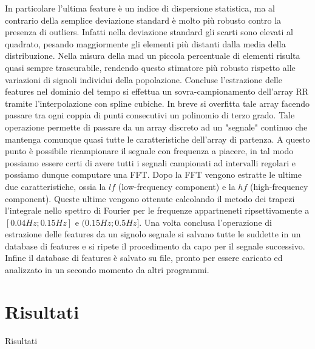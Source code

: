 \documentclass[12pt,a4paper, twoside, openright]{report}
\begin{document}
In particolare l'ultima feature è un indice di dispersione statistica, ma al contrario della semplice deviazione standard è molto più robusto contro la presenza di outliers.
Infatti nella deviazione standard gli scarti sono elevati al quadrato, pesando maggiormente gli elementi più distanti dalla media della distribuzione.
Nella misura della mad un piccola percentuale di elementi risulta quasi sempre trascurabile, rendendo questo stimatore più robusto rispetto alle variazioni di signoli individui della popolazione.
Concluse l'estrazione delle features nel dominio del tempo si effettua un sovra-campionamento dell'array RR tramite l'interpolazione con spline cubiche.
In breve si overfitta tale array facendo passare tra ogni coppia di punti consecutivi un polinomio di terzo grado.
Tale operazione permette di passare da un array discreto ad un "segnale" continuo che mantenga comunque quasi tutte le caratteristiche dell'array di partenza.
A questo punto è possibile ricampionare il segnale con frequenza a piacere, in tal modo possiamo essere certi di avere tutti i segnali campionati ad intervalli regolari e possiamo dunque computare una FFT.
Dopo la FFT vengono estratte le ultime due caratteristiche, ossia la $lf$ (low-frequency component) e la $hf$ (high-frequency component).
Queste ultime vengono ottenute calcolando il metodo dei trapezi l'integrale nello spettro di Fourier per le frequenze appartneneti ripsettivamente a $[0.04Hz;0.15Hz]$ e $(0.15Hz;0.5Hz]$.
Una volta conclusa l'operazione di estrazione delle features da un signolo segnale si salvano tutte le suddette in un database di features e si ripete il procedimento da capo per il segnale successivo.
Infine il database di features è salvato su file, pronto per essere caricato ed analizzato in un secondo momento da altri programmi.
%




\chapter{Risultati}



Risultati
\end{document}
